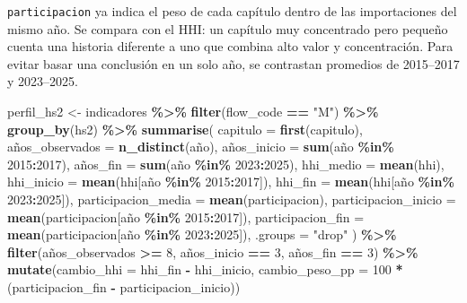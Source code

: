 \documentclass[
]{article}
\newenvironment{Shaded}{\begin{snugshade}}{\end{snugshade}}
\newcommand{\AttributeTok}[1]{\textcolor[rgb]{0.13,0.29,0.53}{#1}}
\newcommand{\DecValTok}[1]{\textcolor[rgb]{0.00,0.00,0.81}{#1}}
\newcommand{\FunctionTok}[1]{\textcolor[rgb]{0.13,0.29,0.53}{\textbf{#1}}}
\newcommand{\NormalTok}[1]{#1}
\newcommand{\OtherTok}[1]{\textcolor[rgb]{0.56,0.35,0.01}{#1}}
\newcommand{\SpecialCharTok}[1]{\textcolor[rgb]{0.81,0.36,0.00}{\textbf{#1}}}
\newcommand{\StringTok}[1]{\textcolor[rgb]{0.31,0.60,0.02}{#1}}
\begin{document}
\texttt{participacion} ya indica el peso de cada capítulo dentro de las
importaciones del mismo año. Se compara con el HHI: un capítulo muy
concentrado pero pequeño cuenta una historia diferente a uno que combina
alto valor y concentración. Para evitar basar una conclusión en un solo
año, se contrastan promedios de 2015--2017 y 2023--2025.

\begin{Shaded}
\begin{Highlighting}[]
\NormalTok{perfil\_hs2 }\OtherTok{\textless{}{-}}\NormalTok{ indicadores }\SpecialCharTok{\%\textgreater{}\%}
  \FunctionTok{filter}\NormalTok{(flow\_code }\SpecialCharTok{==} \StringTok{"M"}\NormalTok{) }\SpecialCharTok{\%\textgreater{}\%}
  \FunctionTok{group\_by}\NormalTok{(hs2) }\SpecialCharTok{\%\textgreater{}\%}
  \FunctionTok{summarise}\NormalTok{(}
    \AttributeTok{capitulo =} \FunctionTok{first}\NormalTok{(capitulo),}
\NormalTok{    años}\AttributeTok{\_observados =} \FunctionTok{n\_distinct}\NormalTok{(año),}
\NormalTok{    años}\AttributeTok{\_inicio =} \FunctionTok{sum}\NormalTok{(año }\SpecialCharTok{\%in\%} \DecValTok{2015}\SpecialCharTok{:}\DecValTok{2017}\NormalTok{),}
\NormalTok{    años}\AttributeTok{\_fin =} \FunctionTok{sum}\NormalTok{(año }\SpecialCharTok{\%in\%} \DecValTok{2023}\SpecialCharTok{:}\DecValTok{2025}\NormalTok{),}
    \AttributeTok{hhi\_medio =} \FunctionTok{mean}\NormalTok{(hhi),}
    \AttributeTok{hhi\_inicio =} \FunctionTok{mean}\NormalTok{(hhi[año }\SpecialCharTok{\%in\%} \DecValTok{2015}\SpecialCharTok{:}\DecValTok{2017}\NormalTok{]),}
    \AttributeTok{hhi\_fin =} \FunctionTok{mean}\NormalTok{(hhi[año }\SpecialCharTok{\%in\%} \DecValTok{2023}\SpecialCharTok{:}\DecValTok{2025}\NormalTok{]),}
    \AttributeTok{participacion\_media =} \FunctionTok{mean}\NormalTok{(participacion),}
    \AttributeTok{participacion\_inicio =} \FunctionTok{mean}\NormalTok{(participacion[año }\SpecialCharTok{\%in\%} \DecValTok{2015}\SpecialCharTok{:}\DecValTok{2017}\NormalTok{]),}
    \AttributeTok{participacion\_fin =} \FunctionTok{mean}\NormalTok{(participacion[año }\SpecialCharTok{\%in\%} \DecValTok{2023}\SpecialCharTok{:}\DecValTok{2025}\NormalTok{]),}
    \AttributeTok{.groups =} \StringTok{"drop"}
\NormalTok{  ) }\SpecialCharTok{\%\textgreater{}\%}
  \FunctionTok{filter}\NormalTok{(años\_observados }\SpecialCharTok{\textgreater{}=} \DecValTok{8}\NormalTok{, años\_inicio }\SpecialCharTok{==} \DecValTok{3}\NormalTok{, años\_fin }\SpecialCharTok{==} \DecValTok{3}\NormalTok{) }\SpecialCharTok{\%\textgreater{}\%}
  \FunctionTok{mutate}\NormalTok{(}\AttributeTok{cambio\_hhi =}\NormalTok{ hhi\_fin }\SpecialCharTok{{-}}\NormalTok{ hhi\_inicio,}
         \AttributeTok{cambio\_peso\_pp =} \DecValTok{100} \SpecialCharTok{*}\NormalTok{ (participacion\_fin }\SpecialCharTok{{-}}\NormalTok{ participacion\_inicio))}


\end{Highlighting}
\end{Shaded}
\end{document}
